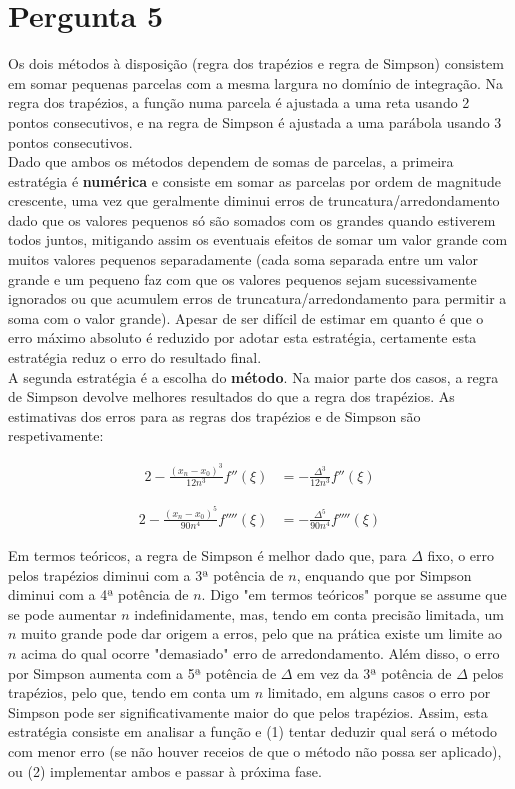 {\section{Pergunta 5} \label{ssec:17_5}
Os dois métodos à disposição (regra dos trapézios e regra de Simpson) consistem em somar pequenas parcelas com a mesma largura no domínio de integração. Na regra dos trapézios, a função numa parcela é ajustada a uma reta usando 2 pontos consecutivos, e na regra de Simpson é ajustada a uma parábola usando 3 pontos consecutivos.\\
Dado que ambos os métodos dependem de somas de parcelas, a primeira estratégia é \textbf{numérica} e consiste em somar as parcelas por ordem de magnitude crescente, uma vez que geralmente diminui erros de truncatura/arredondamento dado que os valores pequenos só são somados com os grandes quando estiverem todos juntos, mitigando assim os eventuais efeitos de somar um valor grande com muitos valores pequenos separadamente (cada soma separada entre um valor grande e um pequeno faz com que os valores pequenos sejam sucessivamente ignorados ou que acumulem erros de truncatura/arredondamento para permitir a soma com o valor grande). Apesar de ser difícil de estimar em quanto é que o erro máximo absoluto é reduzido por adotar esta estratégia, certamente esta estratégia reduz o erro do resultado final.\\
A segunda estratégia é a escolha do \textbf{método}. Na maior parte dos casos, a regra de Simpson devolve melhores resultados do que a regra dos trapézios. As estimativas dos erros para as regras dos trapézios e de Simpson são respetivamente:
\begin{center}
\begin{minipage}[c]{0.5\textwidth}
\begin{alignat*}{2}
	-\frac{(x_n-x_0)^3}{12n^3}f''(\xi)
	&= -\frac{\Delta^3}{12n^3}f''(\xi)
\end{alignat*}
\end{minipage}%
\begin{minipage}[c]{0.5\textwidth}
\begin{alignat*}{2}
	-\frac{(x_n-x_0)^5}{90n^4}f''''(\xi)
	&= -\frac{\Delta^5}{90n^4}f''''(\xi)
\end{alignat*}
\end{minipage}
\end{center}
Em termos teóricos, a regra de Simpson é melhor dado que, para $\Delta$ fixo, o erro pelos trapézios diminui com a 3ª potência de $n$, enquando que por Simpson diminui com a 4ª potência de $n$. Digo "em termos teóricos" porque se assume que se pode aumentar $n$ indefinidamente, mas, tendo em conta precisão limitada, um $n$ muito grande pode dar origem a erros, pelo que na prática existe um limite ao $n$ acima do qual ocorre "demasiado" erro de arredondamento. Além disso, o erro por Simpson aumenta com a 5ª potência de $\Delta$ em vez da 3ª potência de $\Delta$ pelos trapézios, pelo que, tendo em conta um $n$ limitado, em alguns casos o erro por Simpson pode ser significativamente maior do que pelos trapézios. Assim, esta estratégia consiste em analisar a função e (1) tentar deduzir qual será o método com menor erro (se não houver receios de que o método não possa ser aplicado), ou (2) implementar ambos e passar à próxima fase.\\
}
